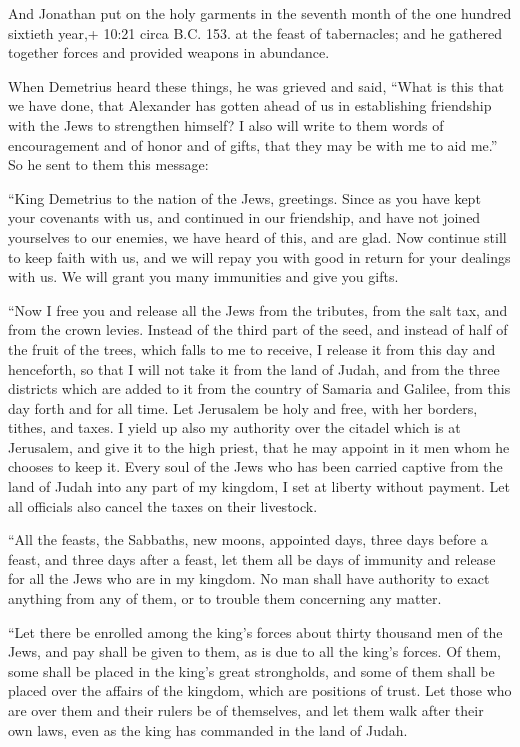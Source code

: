  And Jonathan put on the holy garments in the seventh month
of the one hundred sixtieth year,+ 10:21 circa B.C. 153. at the feast of
tabernacles; and he gathered together forces and provided weapons in
abundance.

 When Demetrius heard these things, he was grieved and
said,  ``What is this that we have done, that Alexander has
gotten ahead of us in establishing friendship with the Jews to
strengthen himself?  I also will write to them words of
encouragement and of honor and of gifts, that they may be with me to aid
me.''  So he sent to them this message:

``King Demetrius to the nation of the Jews, greetings. 
Since as you have kept your covenants with us, and continued in our
friendship, and have not joined yourselves to our enemies, we have heard
of this, and are glad.  Now continue still to keep faith
with us, and we will repay you with good in return for your dealings
with us.  We will grant you many immunities and give you
gifts.

 ``Now I free you and release all the Jews from the
tributes, from the salt tax, and from the crown levies. 
Instead of the third part of the seed, and instead of half of the fruit
of the trees, which falls to me to receive, I release it from this day
and henceforth, so that I will not take it from the land of Judah, and
from the three districts which are added to it from the country of
Samaria and Galilee, from this day forth and for all time. 
Let Jerusalem be holy and free, with her borders, tithes, and taxes.
 I yield up also my authority over the citadel which is at
Jerusalem, and give it to the high priest, that he may appoint in it men
whom he chooses to keep it.  Every soul of the Jews who has
been carried captive from the land of Judah into any part of my kingdom,
I set at liberty without payment. Let all officials also cancel the
taxes on their livestock.

 ``All the feasts, the Sabbaths, new moons, appointed days,
three days before a feast, and three days after a feast, let them all be
days of immunity and release for all the Jews who are in my kingdom.
 No man shall have authority to exact anything from any of
them, or to trouble them concerning any matter.

 ``Let there be enrolled among the king's forces about
thirty thousand men of the Jews, and pay shall be given to them, as is
due to all the king's forces.  Of them, some shall be
placed in the king's great strongholds, and some of them shall be placed
over the affairs of the kingdom, which are positions of trust. Let those
who are over them and their rulers be of themselves, and let them walk
after their own laws, even as the king has commanded in the land of
Judah.


